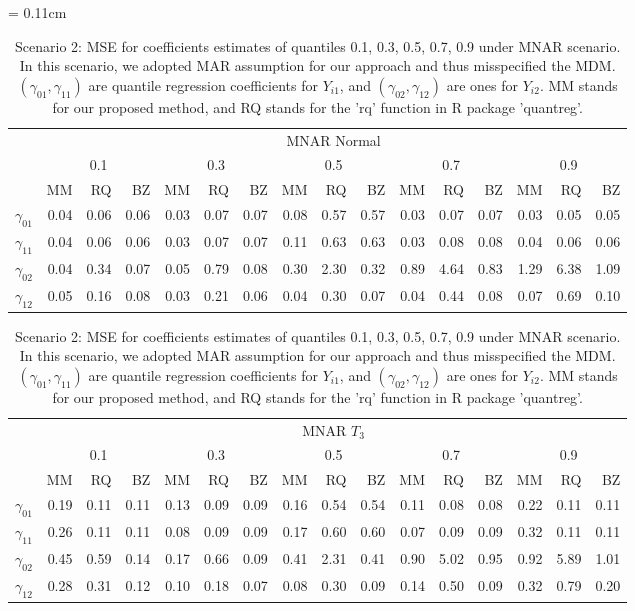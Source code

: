 \documentclass[12pt]{article}
\begin{document}
\begin{table}[h]
  \renewcommand{\arraystretch}{1.3}
  \centering
  \caption{Scenario 2: MSE for coefficients estimates of quantiles
    0.1, 0.3, 0.5, 0.7, 0.9 under MNAR scenario. In this scenario, we adopted MAR assumption
    for our approach and thus misspecified the MDM. $(\gamma_{01}, \gamma_{11})$
    are quantile regression coefficients for $Y_{i1}$, and $(\gamma_{02}, \gamma_{12})$
    are ones for $Y_{i2}$. MM stands for our proposed method, and RQ stands for the 'rq'
    function in R package 'quantreg'.} \label{tab:sim2}
  \vspace{10pt}
  \tabcolsep = 0.11cm
  \begin{tabular}{rrrrrrrrrrrrrrrr}
    \toprule
    & \multicolumn{15}{c}{MNAR Normal} \\
    \cline{2-16}
    &  \multicolumn{3}{c}{0.1} &  \multicolumn{3}{c}{0.3} &  \multicolumn{3}{c}{0.5} &
    \multicolumn{3}{c}{0.7} &  \multicolumn{3}{c}{0.9} \\
    \cline{2-16}
    & MM   & RQ   & BZ   & MM   & RQ   & BZ   & MM   & RQ   & BZ   & MM   & RQ   & BZ   & MM   & RQ   & BZ   \\
    \hline
    $\gamma_{01}$ & 0.04 & 0.06 & 0.06 & 0.03 & 0.07 & 0.07 & 0.08 & 0.57 & 0.57 & 0.03 & 0.07 & 0.07 & 0.03 & 0.05 & 0.05 \\
    $\gamma_{11}$ & 0.04 & 0.06 & 0.06 & 0.03 & 0.07 & 0.07 & 0.11 & 0.63 & 0.63 & 0.03 & 0.08 & 0.08 & 0.04 & 0.06 & 0.06 \\
    $\gamma_{02}$ & 0.04 & 0.34 & 0.07 & 0.05 & 0.79 & 0.08 & 0.30 & 2.30 & 0.32 & 0.89 & 4.64 & 0.83 & 1.29 & 6.38 & 1.09 \\
    $\gamma_{12}$ & 0.05 & 0.16 & 0.08 & 0.03 & 0.21 & 0.06 & 0.04 & 0.30 & 0.07 & 0.04 & 0.44 & 0.08 & 0.07 & 0.69 & 0.10 \\
    \bottomrule
  \end{tabular}

  \begin{tabular}{rrrrrrrrrrrrrrrr}
    \toprule
    & \multicolumn{15}{c}{MNAR $T_3$} \\
    \cline{2-16}
    &  \multicolumn{3}{c}{0.1} &  \multicolumn{3}{c}{0.3} &  \multicolumn{3}{c}{0.5} &
    \multicolumn{3}{c}{0.7} &  \multicolumn{3}{c}{0.9} \\
    \cline{2-16}
    & MM   & RQ   & BZ   & MM   & RQ   & BZ   & MM   & RQ   & BZ   & MM   & RQ   & BZ   & MM   & RQ   & BZ   \\
    \hline
    $\gamma_{01}$ & 0.19 & 0.11 & 0.11 & 0.13 & 0.09 & 0.09 & 0.16 & 0.54 & 0.54 & 0.11 & 0.08 & 0.08 & 0.22 & 0.11 & 0.11 \\
    $\gamma_{11}$ & 0.26 & 0.11 & 0.11 & 0.08 & 0.09 & 0.09 & 0.17 & 0.60 & 0.60 & 0.07 & 0.09 & 0.09 & 0.32 & 0.11 & 0.11 \\
    $\gamma_{02}$ & 0.45 & 0.59 & 0.14 & 0.17 & 0.66 & 0.09 & 0.41 & 2.31 & 0.41 & 0.90 & 5.02 & 0.95 & 0.92 & 5.89 & 1.01 \\
    $\gamma_{12}$ & 0.28 & 0.31 & 0.12 & 0.10 & 0.18 & 0.07 & 0.08 & 0.30 & 0.09 & 0.14 & 0.50 & 0.09 & 0.32 & 0.79 & 0.20 \\
    \bottomrule
  \end{tabular}


\end{table}
\end{document}
